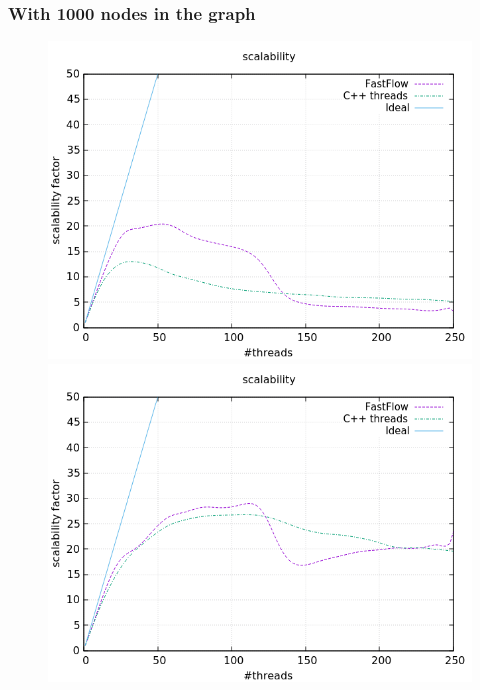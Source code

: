 \documentclass[a4paper,10pt]{article}
\begin{document}
	\subsubsection{With 1000 nodes in the graph}
		\begin{figure}[H]
			\centering
			\begin{minipage}[t]{0.32\linewidth}
				\includegraphics[width=\linewidth]{BenchMarkTSP/scalability/1000/SC1000500_zoom.png}
				\subcaption{}
			\end{minipage}%
			\begin{minipage}[t]{0.32\linewidth}
				\includegraphics[width=\linewidth]{BenchMarkTSP/scalability/1000/SC10005000_zoom.png}
				\subcaption{}
			\end{minipage}

\end{figure}
\end{document}
